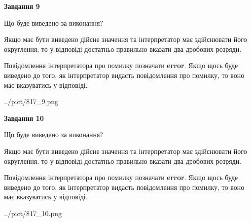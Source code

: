 \documentclass[12pt, ukrainian]{article}
\begin{document}
{\begin {Large}
{\begin {center}\textbf{Завдання 9}\end {center}}\par
Що буде виведено за виконання? \par

Якщо має бути виведено дійсне значення та інтерпретатор має здійснювати його округлення, 
то у відповіді достатньо правильно вказати два дробових розряди.

Повідомлення інтерпретатора про помилку позначати \textbf{error}.
Якщо щось буде виведено до того, як інтерпретатор видасть повідомлення про помилку, 
то воно має вказуватись у відповіді. \par

\begin{center}
	{../pict/817_9.png}
\end{center}
\newpage

{\begin {center}\textbf{Завдання 10}\end {center}}\par
Що буде виведено за виконання? \par

Якщо має бути виведено дійсне значення та інтерпретатор має здійснювати його округлення, 
то у відповіді достатньо правильно вказати два дробових розряди.

Повідомлення інтерпретатора про помилку позначати \textbf{error}.
Якщо щось буде виведено до того, як інтерпретатор видасть повідомлення про помилку, 
то воно має вказуватись у відповіді. \par

\begin{center}
	{../pict/817_10.png}
\end{center}
\newpage

\end {Large}}
\end{document}
